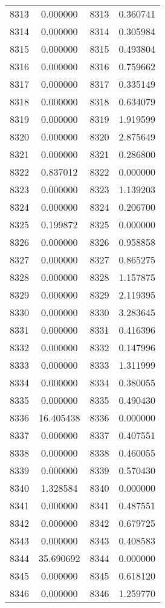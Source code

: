 \documentclass[12pt]{article}
\begin{document}
\begin{longtable}{@{}cccc@{}}
8313 & 0.000000 & 8313 & 0.360741 \\
8314 & 0.000000 & 8314 & 0.305984 \\
8315 & 0.000000 & 8315 & 0.493804 \\
8316 & 0.000000 & 8316 & 0.759662 \\
8317 & 0.000000 & 8317 & 0.335149 \\
8318 & 0.000000 & 8318 & 0.634079 \\
8319 & 0.000000 & 8319 & 1.919599 \\
8320 & 0.000000 & 8320 & 2.875649 \\
8321 & 0.000000 & 8321 & 0.286800 \\
8322 & 0.837012 & 8322 & 0.000000 \\
8323 & 0.000000 & 8323 & 1.139203 \\
8324 & 0.000000 & 8324 & 0.206700 \\
8325 & 0.199872 & 8325 & 0.000000 \\
8326 & 0.000000 & 8326 & 0.958858 \\
8327 & 0.000000 & 8327 & 0.865275 \\
8328 & 0.000000 & 8328 & 1.157875 \\
8329 & 0.000000 & 8329 & 2.119395 \\
8330 & 0.000000 & 8330 & 3.283645 \\
8331 & 0.000000 & 8331 & 0.416396 \\
8332 & 0.000000 & 8332 & 0.147996 \\
8333 & 0.000000 & 8333 & 1.311999 \\
8334 & 0.000000 & 8334 & 0.380055 \\
8335 & 0.000000 & 8335 & 0.490430 \\
8336 & 16.405438 & 8336 & 0.000000 \\
8337 & 0.000000 & 8337 & 0.407551 \\
8338 & 0.000000 & 8338 & 0.460055 \\
8339 & 0.000000 & 8339 & 0.570430 \\
8340 & 1.328584 & 8340 & 0.000000 \\
8341 & 0.000000 & 8341 & 0.487551 \\
8342 & 0.000000 & 8342 & 0.679725 \\
8343 & 0.000000 & 8343 & 0.408583 \\
8344 & 35.690692 & 8344 & 0.000000 \\
8345 & 0.000000 & 8345 & 0.618120 \\
8346 & 0.000000 & 8346 & 1.259770 \\

\end{longtable}
\end{document}
